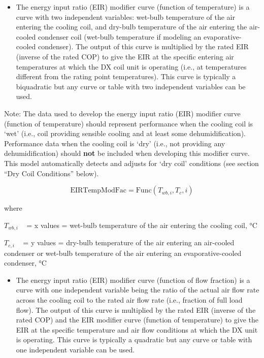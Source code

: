 \begin{itemize}
\tightlist
\item
  The energy input ratio (EIR) modifier curve (function of temperature) is a curve with two independent variables: wet-bulb temperature of the air entering the cooling coil, and dry-bulb temperature of the air entering the air-cooled condenser coil (wet-bulb temperature if modeling an evaporative-cooled condenser). The output of this curve is multiplied by the rated EIR (inverse of the rated COP) to give the EIR at the specific entering air temperatures at which the DX coil unit is operating (i.e., at temperatures different from the rating point temperatures). This curve is typically a biquadratic but any curve or table with two independent variables can be used.
\end{itemize}

Note: The data used to develop the energy input ratio (EIR) modifier curve (function of temperature) should represent performance when the cooling coil is `wet' (i.e., coil providing sensible cooling and at least some dehumidification). Performance data when the cooling coil is `dry' (i.e., not providing any dehumidification) should \textbf{not} be included when developing this modifier curve. This model automatically detects and adjusts for `dry coil' conditions (see section ``Dry Coil Conditions'' below).

\begin{equation}
\text{EIRTempModFac} = \text{Func}\left(T_{wb,i},T_c,i\right)
\end{equation}

where

\({T_{wb,i}}\) ~ = x values = wet-bulb temperature of the air entering the cooling coil, °C

\({T_{c,i}}\) ~ = y values = dry-bulb temperature of the air entering an air-cooled condenser or wet-bulb temperature of the air entering an evaporative-cooled condenser, °C

\begin{itemize}
\tightlist
\item
  The energy input ratio (EIR) modifier curve (function of flow fraction) is a curve with one independent variable being the ratio of the actual air flow rate across the cooling coil to the rated air flow rate (i.e., fraction of full load flow). The output of this curve is multiplied by the rated EIR (inverse of the rated COP) and the EIR modifier curve (function of temperature) to give the EIR at the specific temperature and air flow conditions at which the DX unit is operating. This curve is typically a quadratic but any curve or table with one independent variable can be used.
\end{itemize}

